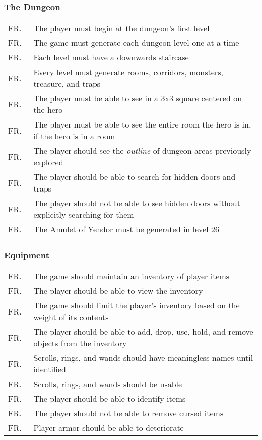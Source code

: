 \documentclass[12pt, titlepage]{article}
\newcounter{FRCounter}
\newcommand{\freq}[1]{
	\hfill\stepcounter{FRCounter}FR.\textbf{\theFRCounter}
	& #1
}
\begin{document}
		\subsubsection{The Dungeon}
			\begin{tabular}{p{0.1\linewidth}p{0.9\linewidth}}
				\freq{The player must begin at the dungeon's first level}\\
				\freq{The game must generate each dungeon level one at a time}\\
				\freq{Each level must have a downwards staircase}\\
				\freq{Every level must generate rooms, corridors, monsters, treasure, and traps}\\
				\freq{The player must be able to see in a 3x3 square centered on the hero}\\
				\freq{The player must be able to see the entire room the hero is in, if the hero is in a room}\\
				\freq{The player should see the \textit{outline} of dungeon areas previously explored}\\
				\freq{The player should be able to search for hidden doors and traps}\\
				\freq{The player should not be able to see hidden doors without explicitly searching for them}\\
				\freq{The Amulet of Yendor must be generated in level 26}\\
			\end{tabular}

		\subsubsection{Equipment}
			\begin{tabular}{p{0.1\linewidth}p{0.9\linewidth}}
				\freq{The game should maintain an inventory of player items}\\
				\freq{The player should be able to view the inventory}\\
				\freq{The game should limit the player's inventory based on the weight of its contents}\\
				\freq{The player should be able to add, drop, use, hold, and remove objects from the inventory}\\
				\freq{Scrolls, rings, and wands should have meaningless names until identified}\\
				\freq{Scrolls, rings, and wands should be usable}\\
				\freq{The player should be able to identify items}\\
				\freq{The player should not be able to remove cursed items}\\
				\freq{Player armor should be able to deteriorate}\\
			\end{tabular}
\end{document}
